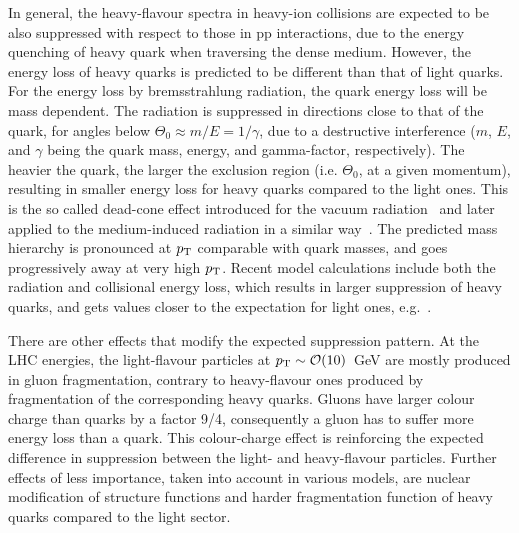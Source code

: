 In general, the heavy-flavour spectra in heavy-ion collisions are expected to be also suppressed with respect to those in pp interactions, due to the energy quenching of heavy quark when traversing the dense medium. However, the energy loss of heavy quarks is predicted to be different than that of light quarks. For the energy loss by bremsstrahlung radiation, the quark energy loss will be mass dependent. The radiation is suppressed in directions close to that of the quark, for angles below $\Theta_0 \approx m/E = 1/\gamma$, due to a destructive interference ($m$, $E$, and $\gamma$ being the quark mass, energy, and gamma-factor, respectively). The heavier the quark, the larger the exclusion region (i.e. $\Theta_0$, at a given momentum), resulting in smaller energy loss for heavy quarks compared to the light ones. This is the so called dead-cone effect introduced for the vacuum radiation~\cite{Dokshitzer:1991fc} and later applied to the medium-induced radiation in a similar way~\cite{Dokshitzer:2001zm}. The predicted mass hierarchy is pronounced at $p_{\rm T}$ comparable with quark masses, and goes progressively away at very high $p_{\rm T}$. Recent model calculations include both the radiation and collisional energy loss, which results in larger suppression of heavy quarks, and gets values closer to the expectation for light ones, e.g.~\cite{Djordjevic:2013pba}.

There are other effects that modify the expected suppression pattern. At the LHC energies, the light-flavour particles at $p_{\rm T} \sim {\cal O}(10)$~GeV are mostly produced in gluon fragmentation, contrary to heavy-flavour ones produced by fragmentation of the corresponding heavy quarks. Gluons have larger colour charge than quarks by a factor 9/4, consequently a gluon has to suffer more energy loss than a quark. This colour-charge effect is reinforcing the expected difference in suppression between the light- and heavy-flavour particles. Further effects of less importance, taken into account in various models, are nuclear modification of structure functions and harder fragmentation function of heavy quarks compared to the light sector.

